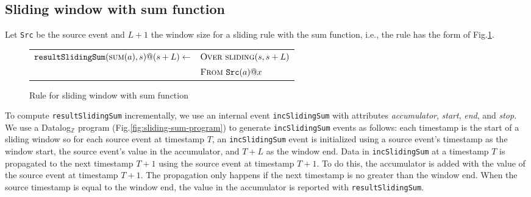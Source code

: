 \subsection{Sliding window with {\sc sum} function}

Let \texttt{Src} be the source event and $L+1$ the window size for a sliding rule
with the {\sc sum} function,
i.e., the rule has the form of Fig.\:\ref{fig:sliding-sum-rule}.

\begin{figure}[h!]
\begin{tabular}{ll}
$\mbox{\tt resultSlidingSum}(\mbox{\sc sum}(a),s)@(s+L) \leftarrow$    & $\textsc{Over}\ \mbox{\sc sliding}(s,s+L)$\\
                                                                        & $\textsc{From}\ \mbox{\tt Src}(a)@x$
\end{tabular}
\caption{Rule for sliding window with {\sc sum} function}
\label{fig:sliding-sum-rule}
\end{figure}

To compute \texttt{resultSlidingSum} incrementally,
we use an internal event \texttt{incSlidingSum}
with attributes {\em accumulator},
{\em start},
{\em end},
and {\em stop}.
We use a Datalog$_{\mathbb{Z}}$ program (Fig.\:\ref{fig:sliding-sum-program})
to generate \texttt{incSlidingSum} events as follows:
each timestamp is the start of a sliding window
so for each source event at timestamp $T$,
an \texttt{incSlidingSum} event is initialized
using a source event's timestamp as the window start,
the source event's value in the accumulator,
and $T{+}L$ as the window end.
Data in \texttt{incSlidingSum} at a timestamp $T$ is propagated
to the next timestamp $T{+}1$ using the source event at timestamp $T{+}1$.
To do this, the accumulator is added with the value of the source event
at timestamp $T{+}1$.
The propagation only happens if the next timestamp is no greater than the window end.
When the source timestamp is equal to the window end,
the value in the accumulator is reported with \texttt{resultSlidingSum}.

